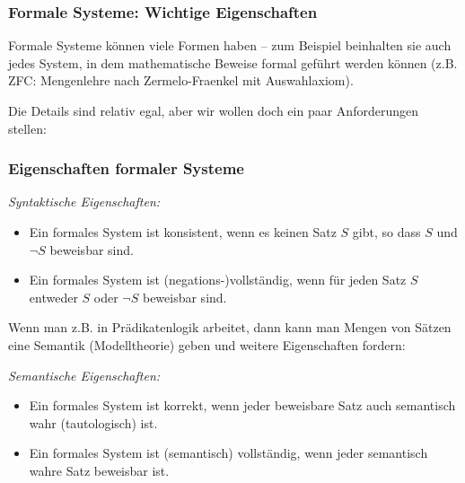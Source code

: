 \documentclass[aspectratio=1610,onlymath]{beamer}
\begin{document}
\begin{frame}\frametitle{Formale Systeme: Wichtige Eigenschaften}

Formale Systeme können viele Formen haben -- zum Beispiel beinhalten sie auch jedes System, in dem mathematische Beweise formal geführt werden können (z.B. ZFC: Mengenlehre nach Zermelo-Fraenkel mit Auswahlaxiom).\bigskip\pause

Die Details sind relativ egal, aber
wir wollen doch ein paar Anforderungen stellen:



\end{frame}

\begin{frame}\frametitle{Eigenschaften formaler Systeme}


\emph{Syntaktische Eigenschaften:}
\begin{itemize}
\item {} Ein formales System ist konsistent, wenn es keinen Satz $S$ gibt,
so dass $S$ und $\neg S$ beweisbar sind.
\item {} Ein formales System ist (negations-)vollständig, wenn für jeden Satz $S$ entweder $S$ oder $\neg S$ beweisbar sind.
\end{itemize}
\medskip\pause

Wenn man z.B. in Prädikatenlogik arbeitet, dann kann man Mengen von Sätzen eine Semantik (Modelltheorie) geben und weitere Eigenschaften fordern:\medskip

\emph{Semantische Eigenschaften:}
\begin{itemize}
\item {} Ein formales System ist korrekt, wenn jeder beweisbare Satz auch semantisch wahr (tautologisch) ist.
\item {} Ein formales System ist (semantisch) vollständig, wenn jeder semantisch wahre Satz beweisbar ist.
\end{itemize}

\end{frame}
\end{document}
